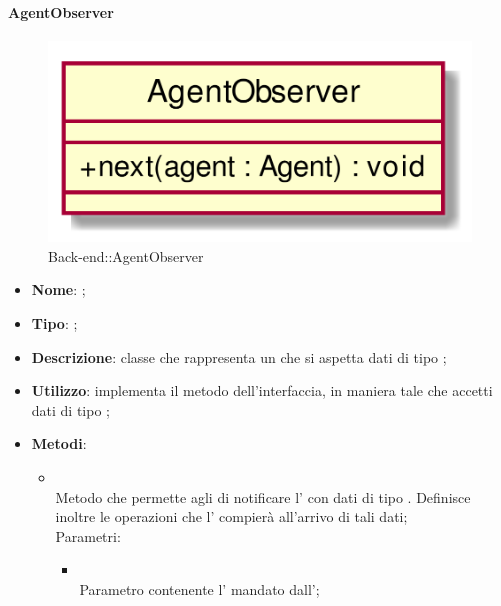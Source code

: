 \hypertarget{AgentObserver_label}{\paragraph{AgentObserver}}
\begin{figure}[h]
	\centering
	\includegraphics[width=\textwidth,height=\textheight,keepaspectratio]{images/ClassAgentObserver.png}
	\caption{Back-end::AgentObserver}
\end{figure}
\begin{itemize}
	\item \textbf{Nome}: ;
	\item \textbf{Tipo}: ;
	\item \textbf{Descrizione}: classe che rappresenta un  che si aspetta dati di tipo ;
	\item \textbf{Utilizzo}: implementa il metodo  dell'interfaccia, in maniera tale che accetti dati di tipo ;
	\item \textbf{Metodi}:
	\begin{itemize}
		\item[]  \\
		Metodo che permette agli  di notificare l' con dati di tipo . Definisce inoltre le operazioni che l' compierà all'arrivo di tali dati;\\
		Parametri:
		\begin{itemize}
			\item {} \\
			Parametro contenente l' mandato dall';
		\end{itemize}
	\end{itemize}
\end{itemize}

